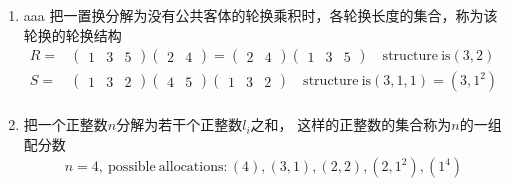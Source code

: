 \begin{note}
	\begin{enumerate}
		\item aaa
		把一置换分解为没有公共客体的轮换乘积时，各轮换长度的集合，称为该轮换的{\color{seco}轮换结构}
		\begin{equation}\begin{aligned}
		R={}&
		\begin{pmatrix}
		1&3&5
		\end{pmatrix}
		\begin{pmatrix}
		2&4
		\end{pmatrix}
		=\begin{pmatrix}
		2&4
		\end{pmatrix}
		\begin{pmatrix}
		1&3&5
		\end{pmatrix}\quad \mathrm{structure~is}(3,2)\\
		S={}&
		\begin{pmatrix}
		1&3&2
		\end{pmatrix}
		\begin{pmatrix}
		4&5
		\end{pmatrix}
		\begin{pmatrix}
		1&3&2
		\end{pmatrix}\quad \mathrm{structure~is}(3,1,1)=(3,1^2)\\
		\end{aligned}\end{equation}
		\item 
		把一个正整数$n$分解为若干个正整数$l_i$之和，
		这样的正整数的集合称为$n$的一组{\color{seco}配分数}
		\begin{equation}\begin{aligned}
		n=4,~ \mathrm{possible~allocations:}(4),(3,1),(2,2),(2,1^2),(1^4)

\end{aligned}
\end{equation}
\end{enumerate}
\end{note}
